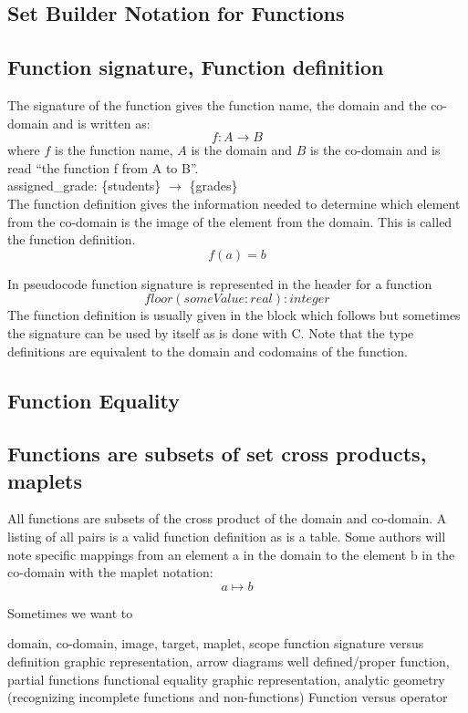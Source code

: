 \subsection {Set Builder Notation for Functions}



\subsection {Function signature, Function definition}
The signature of the function gives the function name, the domain and the co-domain and is written as:
$$f:A \rightarrow B$$ 
where $f$ is the function name, $A$ is the domain and $B$ is the co-domain and is read ``the function f from A to B''. \\
assigned\_grade: \{students\} $\rightarrow$ \{grades\}\\
The function definition gives the information needed to determine which element from the co-domain is the image of the element from the domain. This is called the function definition. 
$$f(a)=b$$

In pseudocode function signature is represented in the header for a function
$$floor (someValue:real): integer $$
The function definition is usually given in the block which follows but sometimes the signature can be used by itself as is done with C. Note that the type definitions are equivalent to the domain and codomains of the function.

\subsection {Function Equality}

\subsection {Functions are subsets of set cross products, maplets}
All functions are subsets of the cross product of the domain and co-domain. A listing of all pairs is a valid function definition as is a table. Some authors will note specific mappings from an element a in the domain to the element b in the co-domain with the maplet notation:
$$ a \mapsto b$$ 



Sometimes we want to 

domain, co-domain, image, target, maplet, scope
function signature versus definition
graphic representation, arrow diagrams
well defined/proper function, partial functions
functional equality
graphic representation, analytic geometry (recognizing incomplete functions and non-functions)
Function versus operator

